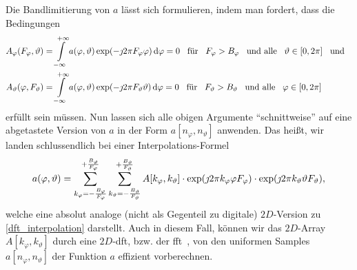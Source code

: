 Die Bandlimitierung von $a$ l\"asst sich formulieren, indem man fordert, dass die Bedingungen
\begin{align}
    A_{\varphi}(F_\varphi, \vartheta) 
    &= {\int\limits_{-\infty}^{+\infty}{
        a(\varphi, \vartheta) \exp(-\jmath 2 \pi F_\varphi \varphi)
    }\,\mathrm{d}{\varphi}} = 0 
    {\hspace{3mm} \text{f\"ur} \hspace{3mm}} F_\varphi > B_\varphi {\hspace{3mm} \text{und alle} \hspace{3mm}} \vartheta \in [0, 2 \pi] {\hspace{3mm} \text{und} \hspace{3mm}} \\
    A_{\vartheta}(\varphi, F_\vartheta) 
    &= {\int\limits_{-\infty}^{+\infty}{
        a(\varphi, \vartheta) \exp(-\jmath 2 \pi F_\vartheta \vartheta)
    }\,\mathrm{d}{\varphi}} = 0 
    {\hspace{3mm} \text{f\"ur} \hspace{3mm}} F_\vartheta > B_\vartheta {\hspace{3mm} \text{und alle} \hspace{3mm}} \varphi \in [0, 2 \pi]
\end{align}
erf\"ullt sein m\"ussen. Nun lassen sich alle obigen Argumente ``schnittweise'' auf eine abgetastete Version von $a$ in der Form $a[n_\varphi, n_\vartheta]$ anwenden. Das hei{\ss}t, wir landen schlussendlich bei einer Interpolations-Formel
\begin{equation}\label{2d_dft_interpolation}
    a(\varphi, \vartheta) = {\sum\limits_{k_\varphi=-\frac{B_\varphi}{F_\varphi}}^{+\frac{B_\varphi}{F_\varphi}}{
        {\sum\limits_{k_\vartheta=-\frac{B_\vartheta}{F_\vartheta}}^{+\frac{B_\vartheta}{F_\vartheta}}{
            A[k_\varphi, k_\vartheta] 
            \cdot \exp(\jmath 2 \pi k_\varphi \varphi F_\varphi)
            \cdot \exp(\jmath 2 \pi k_\vartheta \vartheta F_\vartheta)
        }}
    }},
\end{equation}
welche eine absolut analoge (nicht als Gegenteil zu digitale) $2D$-Version zu \eqref{dft_interpolation} darstellt. Auch in diesem Fall, k\"onnen wir das $2D$-Array $A[k_\varphi, k_\vartheta]$ durch eine $2D$-\gls{dft}, bzw. der \gls{fft}~\cite{FFTW05}, von den uniformen Samples $a[n_\varphi, n_\vartheta]$ der Funktion $a$ effizient vorberechnen.

